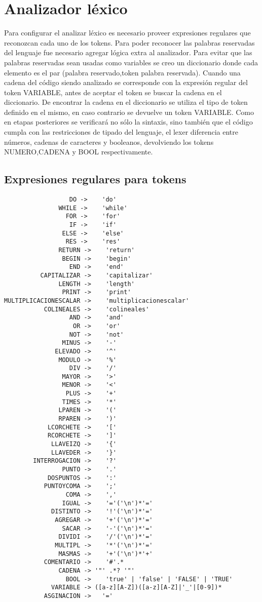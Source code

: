 \section{Analizador léxico }

Para configurar el analizar léxico es necesario proveer expresiones regulares que reconozcan cada uno de los tokens. Para poder reconocer las palabras reservadas del lenguaje  fue necesario agregar lógica extra al analizador. Para evitar que las palabras reservadas sean usadas como variables se creo un diccionario donde cada elemento es el par (palabra reservado,token palabra reservada). Cuando una cadena del código siendo analizado se corresponde con la expresión regular del token VARIABLE, antes de aceptar el token se buscar la cadena en el diccionario. De encontrar la cadena en el diccionario se utiliza el tipo de token definido en el mismo, en caso contrario se devuelve un token VARIABLE. 
Como en etapas posteriores se verificará no sólo la sintaxis, sino también que el código cumpla con las restricciones de tipado del lenguaje, el lexer diferencia entre números, cadenas de caracteres y booleanos, devolviendo los tokens NUMERO,CADENA y BOOL respectivamente.

\subsection{Expresiones regulares para tokens}

\begin{verbatim}
                  DO ->    'do'
               WHILE ->    'while'
                 FOR ->    'for'
                  IF ->    'if'
                ELSE ->    'else'
                 RES ->    'res'
               RETURN ->    'return'
                BEGIN ->    'begin'
                  END ->    'end'
          CAPITALIZAR ->    'capitalizar'
               LENGTH ->    'length'
                PRINT ->    'print'
MULTIPLICACIONESCALAR ->    'multiplicacionescalar'
           COLINEALES ->    'colineales'
                  AND ->    'and'
                   OR ->    'or'
                  NOT ->    'not'
                MINUS ->    '-'
              ELEVADO ->    '^'
               MODULO ->    '%'
                  DIV ->    '/'
                MAYOR ->    '>'
                MENOR ->    '<'
                 PLUS ->    '+'
                TIMES ->    '*'
               LPAREN ->    '('
               RPAREN ->    ')'
            LCORCHETE ->    '['
            RCORCHETE ->    ']'
             LLAVEIZQ ->    '{'
             LLAVEDER ->    '}'
        INTERROGACION ->    '?'
                PUNTO ->    '.'
            DOSPUNTOS ->    ':'
           PUNTOYCOMA ->    ';'
                 COMA ->    ','
                IGUAL ->    '='('\n')*'='
             DISTINTO ->    '!'('\n')*'='
              AGREGAR ->    '+'('\n')*'='
                SACAR ->    '-'('\n')*'='
               DIVIDI ->    '/'('\n')*'='
              MULTIPL ->    '*'('\n')*'='
               MASMAS ->    '+'('\n')*'+'
           COMENTARIO ->    '#'.*
               CADENA -> '"' .*? '"'
                 BOOL ->    'true' | 'false' | 'FALSE' | 'TRUE'
             VARIABLE -> ([a-z][A-Z])([a-z][A-Z]|'_'|[0-9])*
           ASGINACION ->   '='

\end{verbatim}
